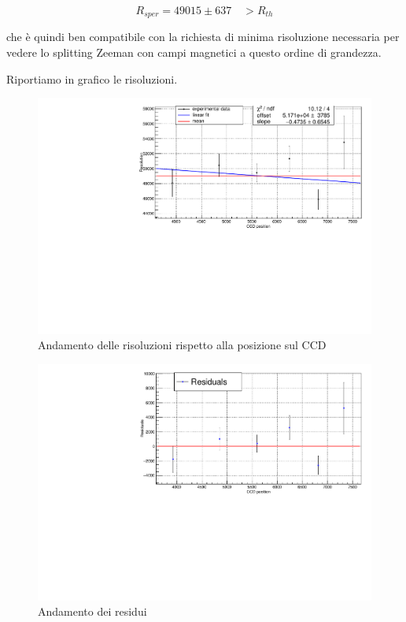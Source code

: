 \documentclass{article}
\begin{document}
	\[
		R_{sper} = 49015 \pm 637	\quad > R_{th}	
	\]

	che è quindi ben compatibile con la richiesta di minima risoluzione
	necessaria per vedere lo splitting Zeeman con campi magnetici a questo 
	ordine di grandezza.

	Riportiamo in grafico le risoluzioni.

	\begin{center}
		\begin{figure}[H]
			\centering
			\includegraphics[scale=0.38, angle=0]{campospento/ris.pdf}
			\caption{Andamento delle risoluzioni rispetto alla posizione sul CCD}
			\label{fig:deltaxruBoff}
		\end{figure}
	\end{center}

	\begin{center}
		\begin{figure}[H]
			\centering
			\includegraphics[scale=0.38, angle=0]{campospento/resris.pdf}
			\caption{Andamento dei residui}
			\label{fig:deltaxruBoffres}
		\end{figure}
	\end{center}
\end{document}
